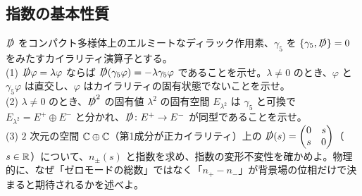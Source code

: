 \subsection{指数の基本性質}

\begin{problem}[難易度 A]\label{ch09-prob-pair}
$\slashed D$ をコンパクト多様体上のエルミートなディラック作用素、$\gamma_5$ を $\{\gamma_5,\slashed D\}=0$ をみたすカイラリティ演算子とする。\\
(1) $\slashed D\varphi=\lambda\varphi$ ならば $\slashed D(\gamma_5\varphi)=-\lambda\gamma_5\varphi$ であることを示せ。$\lambda\neq0$ のとき、$\varphi$ と $\gamma_5\varphi$ は直交し、$\varphi$ はカイラリティの固有状態でないことを示せ。\\
(2) $\lambda\neq0$ のとき、$\slashed D^2$ の固有値 $\lambda^2$ の固有空間 $E_{\lambda^2}$ は $\gamma_5$ と可換で $E_{\lambda^2}=E^+\oplus E^-$ と分かれ、$\slashed D\colon E^+\to E^-$ が同型であることを示せ。\\
(3) $2$ 次元の空間 $\mathbb{C}\oplus\mathbb{C}$（第1成分が正カイラリティ）上の $\slashed D(s)=\begin{pmatrix}0&s\\ s&0\end{pmatrix}$（$s\in\mathbb{R}$）について、$n_\pm(s)$ と指数を求め、指数の変形不変性を確かめよ。物理的に、なぜ「ゼロモードの総数」ではなく「$n_+-n_-$」が背景場の位相だけで決まると期待されるかを述べよ。
\end{problem}

